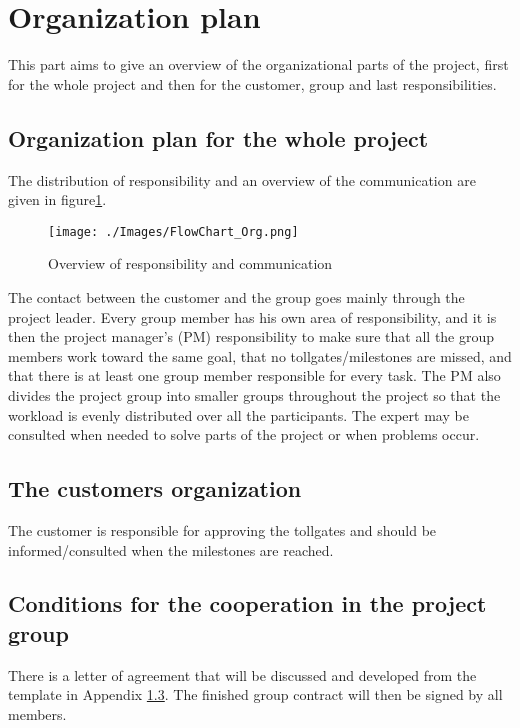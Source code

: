 \section{Organization plan}
This part aims to give an overview of the organizational parts of the project, first for the whole project and then for the customer, group and last responsibilities.
\subsection{Organization plan for the whole project}
The distribution of responsibility and an overview of the communication are given in figure\ref{FlowOrg}.
\begin{figure}[h]
	\texttt{[image: ./Images/FlowChart\_Org.png]}
	\caption{Overview of responsibility and communication}
	\label{FlowOrg}
\end{figure}
The contact between the customer and the group goes mainly through the project leader. Every group member has his own area of responsibility, and it is then the project manager’s (PM) responsibility to make sure that all the group members work toward the same goal, that no tollgates/milestones are missed, and that there is at least one group member responsible for every task. The PM also divides the project group into smaller groups throughout the project so that the workload is evenly distributed over all the participants. The expert may be consulted when needed to solve parts of the project or when problems occur.
\subsection{The customers organization}
The customer is responsible for approving the tollgates and should be informed/consulted when the milestones are reached.
\subsection{Conditions for the cooperation in the project group}
There is a letter of agreement that will be discussed and developed from the template in Appendix \ref{}. The finished group contract will then be signed by all members.
